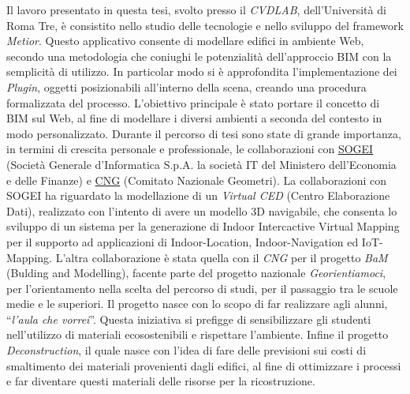 Il lavoro presentato in questa tesi, svolto presso il \emph{CVDLAB},
dell'Università di Roma Tre, è consistito nello studio delle tecnologie e nello sviluppo del
framework \emph{Metior}.
Questo applicativo consente di modellare edifici in ambiente Web, secondo una metodologia che coniughi le potenzialità
dell’approccio BIM con la semplicità di utilizzo.
In particolar modo si è approfondita l'implementazione dei \emph{Plugin}, oggetti posizionabili all'interno della scena, creando
una procedura formalizzata del processo.
L'obiettivo principale è stato portare il concetto di BIM sul Web, al fine di modellare i diversi ambienti a seconda del
contesto in modo personalizzato.
Durante il percorso di tesi sono state di grande importanza, in termini di crescita personale e professionale,
le collaborazioni con \href{http://www.sogei.it/flex/cm/pages/ServeBLOB.php/L/IT/IDPagina/116}{SOGEI} (Società Generale d'Informatica S.p.A. la società IT del Ministero dell'Economia e delle Finanze)
e \href{http://www.cng.it/it/consiglio-nazionale}{CNG} (Comitato Nazionale Geometri).
La collaborazioni con SOGEI ha riguardato la modellazione di un \emph{Virtual CED} (Centro Elaborazione Dati),
realizzato con l'intento di avere un modello 3D navigabile, che consenta lo sviluppo di un sistema per
la generazione di Indoor Intercactive Virtual Mapping per il supporto ad applicazioni di Indoor-Location, Indoor-Navigation
ed IoT-Mapping.
L'altra collaborazione è stata quella con il \emph{CNG} per il progetto \emph{BaM}
(Bulding and Modelling),
facente parte del progetto nazionale \emph{Georientiamoci}, per l'orientamento nella scelta del percorso di studi,
per il passaggio tra le scuole medie e le superiori.
Il progetto nasce con lo scopo di far realizzare agli alunni, ``\emph{l'aula che vorrei}''.
Questa iniziativa si prefigge di sensibilizzare gli studenti nell'utilizzo di
materiali ecosostenibili e rispettare l'ambiente.
Infine il progetto \emph{Deconstruction}, il quale nasce con l'idea di fare delle previsioni
sui costi di smaltimento dei materiali provenienti dagli edifici, al fine di ottimizzare i processi e far
diventare questi materiali delle risorse per la ricostruzione.
